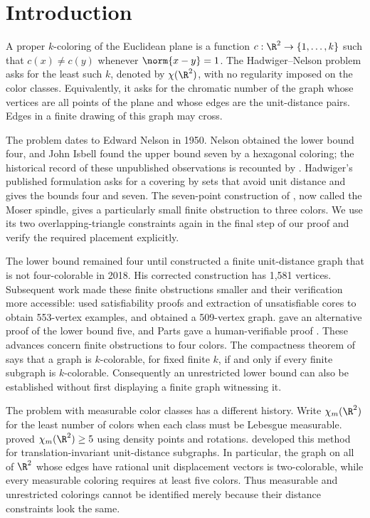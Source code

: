 \section{Introduction}\label{sec:introduction}

A proper $k$-coloring of the Euclidean plane is a function
$c:\R^2\to\{1,\ldots,k\}$ such that $c(x)\ne c(y)$ whenever
$\norm{x-y}=1$. The Hadwiger--Nelson problem asks for the least such
$k$, denoted by $\chi(\R^2)$, with no regularity imposed on the color
classes. Equivalently, it asks for the chromatic number of the graph
whose vertices are all points of the plane and whose edges are the
unit-distance pairs. Edges in a finite drawing of this graph may cross.

The problem dates to Edward Nelson in 1950. Nelson obtained the lower
bound four, and John Isbell found the upper bound seven by a hexagonal
coloring; the historical record of these unpublished observations is
recounted by \citet[pp.~15--19]{Soifer2003History}. Hadwiger's published
formulation \citep{Hadwiger1961} asks for a covering by sets that avoid
unit distance and gives the bounds four and seven. The seven-point
construction of \citet{MoserMoser1961}, now called the Moser spindle,
gives a particularly small finite obstruction to three colors. We use
its two overlapping-triangle constraints again in the final step of our
proof and verify the required placement explicitly.

The lower bound remained four until \citet{deGrey2018} constructed a
finite unit-distance graph that is not four-colorable in 2018.
His corrected construction has 1,581 vertices. Subsequent work made
these finite obstructions smaller and their verification more accessible:
\citet{Heule2018} used satisfiability proofs and extraction of
unsatisfiable cores to obtain 553-vertex examples, and
\citet{Parts2020Minimization} obtained a 509-vertex graph.
\citet{ExooIsmailescu2020} gave an alternative proof of the lower bound five,
and Parts gave a human-verifiable proof \citep{Parts2020Human}.
These advances concern finite obstructions to four colors. The
compactness theorem of \citet[Theorem~1]{deBruijnErdos1951} says that a
graph is $k$-colorable, for fixed finite $k$, if and only if every finite
subgraph is $k$-colorable. Consequently an unrestricted lower bound can
also be established without first displaying a finite graph witnessing
it.

The problem with measurable color classes has a different history.
Write $\chi_m(\R^2)$ for the least number of colors when each class must
be Lebesgue measurable. \citet{Falconer1981} proved
$\chi_m(\R^2)\ge5$ using density points and rotations.
\citet{Payne2009} developed this method for translation-invariant
unit-distance subgraphs. In particular, the graph on all of $\R^2$
whose edges have rational unit displacement vectors is two-colorable,
while every measurable coloring requires at least five colors. Thus
measurable and unrestricted colorings cannot be identified merely
because their distance constraints look the same.

